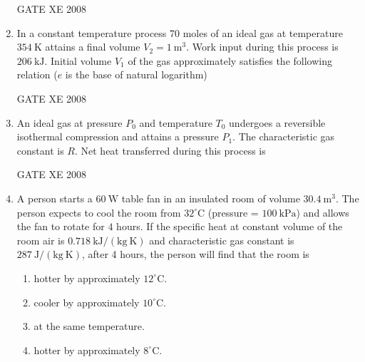\documentclass[12pt]{article}
\begin{document}
\begin{enumerate}[label=Q\arabic*.]
GATE XE 2008

\item In a constant temperature process 70 moles of an ideal gas at temperature $354\ \mathrm{K}$ attains a final volume $V_2 = 1\ \mathrm{m^3}$. Work input during this process is $206\ \mathrm{kJ}$. Initial volume $V_1$ of the gas approximately satisfies the following relation ($e$ is the base of natural logarithm)  

\begin{enumerate}[label=(\Alph*)]
\end{enumerate}

GATE XE 2008

\item An ideal gas at pressure $P_0$ and temperature $T_0$ undergoes a reversible isothermal compression and attains a pressure $P_1$. The characteristic gas constant is $R$. Net heat transferred during this process is  

\begin{enumerate}[label=(\Alph*)]
\end{enumerate}

GATE XE 2008

\item A person starts a $60\ \mathrm{W}$ table fan in an insulated room of volume $30.4\ \mathrm{m^3}$. The person expects to cool the room from $32^\circ\mathrm{C}$ (pressure = $100\ \mathrm{kPa}$) and allows the fan to rotate for $4$ hours. If the specific heat at constant volume of the room air is $0.718\ \mathrm{kJ/(kg\ K)}$ and characteristic gas constant is $287\ \mathrm{J/(kg\ K)}$, after 4 hours, the person will find that the room is  

\begin{enumerate}[label=(\Alph*)]
\item  hotter by approximately $12^\circ$C.
\item  cooler by approximately $10^\circ$C.
\item  at the same temperature.
\item  hotter by approximately $8^\circ$C.
\end{enumerate}


\end{enumerate}
\end{document}

